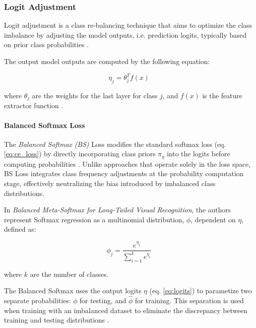 \subsubsection{Logit Adjustment}
\label{sec:logit_adjust}
Logit adjustment is a class re-balancing technique that aims to optimize the class imbalance by adjusting the model outputs, i.e. prediction logits, typically based on prior class probabilities \cite{menon2021longtaillearninglogitadjustment,ren2020balancedmetasoftmaxlongtailedvisual}.  

The output model outputs are computed by the following equation:

\begin{equation}
    \label{eq:logits}
    \eta_j = \theta^T_j f(x)
\end{equation}

where $\theta_j$ are the weights for the last layer for class $j$, and $f(x)$ is the feature extractor function \cite{ren2020balancedmetasoftmaxlongtailedvisual}.

\paragraph{Balanced Softmax Loss}
The \emph{Balanced Softmax (BS)} Loss modifies the standard softmax loss (eq. \eqref{eq:ce_loss}) by directly incorporating class priors $\pi_y$ into the logits before computing probabilities \cite{ren2020balancedmetasoftmaxlongtailedvisual}. Unlike approaches that operate solely in the loss space, BS Loss integrates class frequency adjustments at the probability computation stage, effectively neutralizing the bias introduced by imbalanced class distributions. 

In \emph{Balanced Meta-Softmax for Long-Tailed Visual Recognition}, the authors represent Softmax regression as a multinomial distribution, $\phi$, dependent on $\eta$, defined as:

\begin{equation}
    \phi_j = \frac{e^{\eta_j}}{\sum_{i=1}^{k}e^{\eta_i}}
\end{equation}

where $k$ are the number of classes.

The Balanced Softmax uses the output logits $\eta$ (eq. \eqref{eq:logits}) to parametize two separate probabilities: $\phi$ for testing, and $\hat{\phi}$ for training. This separation is used when training with an imbalanced dataset to eliminate the discrepancy between training and testing distributions \cite{ren2020balancedmetasoftmaxlongtailedvisual}.

